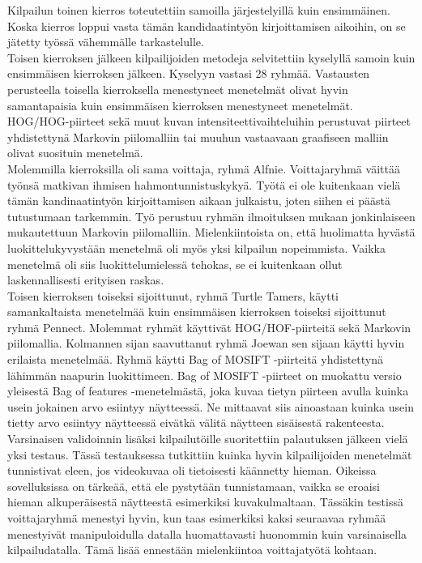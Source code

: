 Kilpailun toinen kierros toteutettiin samoilla järjestelyillä kuin ensimmäinen. Koska kierros loppui
vasta tämän kandidaatintyön kirjoittamisen aikoihin, on se jätetty työssä vähemmälle tarkastelulle.\\

Toisen kierroksen jälkeen kilpailijoiden metodeja selvitettiin kyselyllä samoin kuin ensimmäisen
kierroksen jälkeen. Kyselyyn vastasi 28 ryhmää. Vastausten perusteella toisella kierroksella menestyneet 
menetelmät olivat hyvin samantapaisia kuin ensimmäisen kierroksen menestyneet menetelmät. HOG/HOG-piirteet sekä muut
kuvan intensiteettivaihteluihin perustuvat piirteet yhdistettynä Markovin piilomalliin tai muuhun
vastaavaan graafiseen malliin olivat suosituin menetelmä. \citep{chalearn2}\\

Molemmilla kierroksilla oli sama voittaja, ryhmä Alfnie. 
Voittajaryhmä väittää työnsä matkivan ihmisen hahmontunnistuskykyä. Työtä ei ole kuitenkaan vielä tämän kandinaatintyön kirjoittamisen aikaan julkaistu,
 joten siihen ei päästä tutustumaan tarkemmin. Työ perustuu
ryhmän ilmoituksen mukaan jonkinlaiseen mukautettuun Markovin piilomalliin. Mielenkiintoista on,
että huolimatta hyvästä luokittelukyvystään menetelmä oli myös yksi kilpailun nopeimmista. Vaikka menetelmä oli siis 
luokittelumielessä tehokas, se ei kuitenkaan ollut laskennallisesti erityisen raskas. \citep{chalearn2}\\

Toisen kierroksen toiseksi sijoittunut, ryhmä Turtle Tamers, käytti samankaltaista menetelmää kuin 
ensimmäisen kierroksen toiseksi sijoittunut ryhmä Pennect. Molemmat ryhmät käyttivät HOG/HOF-piirteitä sekä Markovin piilomallia. 
Kolmannen sijan saavuttanut ryhmä Joewan sen sijaan käytti hyvin erilaista menetelmää. Ryhmä käytti Bag of MOSIFT -piirteitä 
yhdistettynä lähimmän naapurin luokittimeen. \citep{chalearn2} Bag of MOSIFT -piirteet on muokattu versio
yleisestä Bag of features -menetelmästä, joka kuvaa tietyn piirteen avulla
kuinka usein jokainen arvo esiintyy näytteessä. Ne mittaavat siis ainoastaan kuinka usein tietty arvo esiintyy näytteessä eivätkä 
välitä näytteen sisäisestä rakenteesta. \citep{bagoffeatures} \\

Varsinaisen validoinnin lisäksi kilpailutöille suoritettiin palautuksen jälkeen vielä yksi testaus. Tässä testauksessa tutkittiin kuinka 
hyvin kilpailijoiden menetelmät tunnistivat eleen, jos videokuvaa oli tietoisesti käännetty hieman. Oikeissa sovelluksissa on tärkeää,
että ele pystytään tunnistamaan, vaikka se eroaisi hieman alkuperäisestä näytteestä esimerkiksi kuvakulmaltaan. 
Tässäkin testissä voittajaryhmä menestyi hyvin, kun taas esimerkiksi kaksi seuraavaa ryhmää menestyivät manipuloidulla datalla huomattavasti
huonommin kuin varsinaisella kilpailudatalla. Tämä lisää ennestään mielenkiintoa voittajatyötä kohtaan. \citep{chalearn2}


